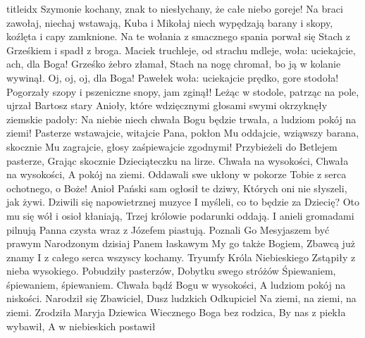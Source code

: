 \documentclass[a5paper, portrait, 12pt]{mwart}
\begin{document}
\begin{songs}{titleidx}
Szymonie kochany, znak to niesłychany,
że całe niebo goreje!
Na braci zawołaj, niechaj wstawają,
Kuba i Mikołaj niech wypędzają
barany i skopy, koźlęta i capy zamknione.
\endchorus
\beginverse
Na te wołania z smacznego spania
porwał się Stach z Grześkiem i spadł z broga.
Maciek truchleje, od strachu mdleje,
woła: uciekajcie, ach, dla Boga!
\endverse
\beginchorus
Grześko żebro złamał, Stach na nogę chromał,
bo ją w kolanie wywinął.
Oj, oj, oj, dla Boga! Pawełek woła:
uciekajcie prędko, gore stodoła!
Pogorzały szopy i pszeniczne snopy, jam zginął!
\endchorus
\beginverse
Leżąc w stodole, patrząc na pole,
ujrzał Bartosz stary Anioły,
które wdzięcznymi głosami swymi
okrzyknęły ziemskie padoły:
\endverse
\beginchorus
Na niebie niech chwała Bogu będzie trwała,
a ludziom pokój na ziemi!
Pasterze wstawajcie, witajcie Pana,
pokłon Mu oddajcie, wziąwszy barana,
skocznie Mu zagrajcie, głosy zaśpiewajcie zgodnymi!
\endchorus
\endsong
\beginverse
    Przybieżeli do Betlejem pasterze,
    Grając skocznie Dzieciąteczku na lirze.
\endverse
\beginchorus
	Chwała na wysokości,
	Chwała na wysokości,
	A pokój na ziemi.
\endchorus
\beginverse
    Oddawali swe ukłony w pokorze
    Tobie z serca ochotnego, o Boże!
\endverse
\beginverse
    Anioł Pański sam ogłosił te dziwy,
    Których oni nie słyszeli, jak żywi.
\endverse
\beginverse
    Dziwili się napowietrznej muzyce
    I myśleli, co to będzie za Dziecię?
\endverse
\beginverse
    Oto mu się wół i osioł kłaniają,
    Trzej królowie podarunki oddają.
\endverse
\beginverse
    I anieli gromadami pilnują
    Panna czysta wraz z Józefem piastują.
\endverse
\beginverse
    Poznali Go Mesyjaszem być prawym
    Narodzonym dzisiaj Panem łaskawym
\endverse
\beginverse
    My go także Bogiem, Zbawcą już znamy
    I z całego serca wszyscy kochamy.
\endverse
\endsong
\beginverse
    Tryumfy Króla Niebieskiego
    Zstąpiły z nieba wysokiego.
\endverse
\beginchorus
    Pobudziły pasterzów,
    Dobytku swego stróżów
    Śpiewaniem, śpiewaniem, śpiewaniem.
\endchorus
\beginverse
    Chwała bądź Bogu w wysokości,
    A ludziom pokój na niskości.
\endverse
\beginchorus
    Narodził się Zbawiciel,
    Dusz ludzkich Odkupiciel
    Na ziemi, na ziemi, na ziemi.
\endchorus
\beginverse
    Zrodziła Maryja Dziewica
    Wiecznego Boga bez rodzica,
\endverse
\beginchorus
    By nas z piekła wybawił,
    A w niebieskich postawił

\end{songs}
\end{document}
